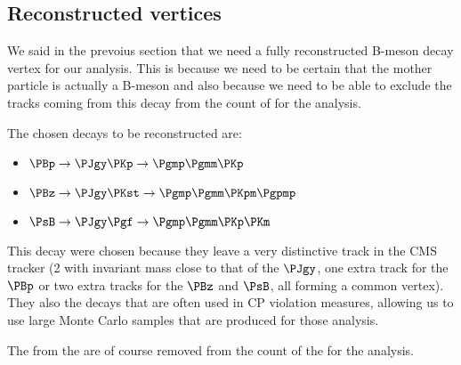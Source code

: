 \subsection{Reconstructed vertices}
\label{subsec:reco_ver}

We said in the prevoius section that we need a fully reconstructed B-meson decay vertex for our analysis.
This is because we need to be certain that the mother particle is actually a B-meson and also because we need to be able to exclude the tracks coming from this decay from the count of \Pgm for the analysis.

The chosen decays to be reconstructed are:
\begin{itemize}
	\item $\PBp\to\PJgy\PKp\to\Pgmp\Pgmm\PKp$
	\item $\PBz\to\PJgy\PKst\to\Pgmp\Pgmm\PKpm\Pgpmp$
	\item $\PsB\to\PJgy\Pgf\to\Pgmp\Pgmm\PKp\PKm$
\end{itemize}

This decay were chosen because they leave a very distinctive track in the CMS tracker (2 \Pgm with invariant mass close to that of the $\PJgy$, one extra track for the $\PBp$ or two extra tracks for the $\PBz$ and $\PsB$, all forming a common vertex).
They also the decays that are often used in CP violation measures, allowing us to use large Monte Carlo samples that are produced for those analysis.

The \Pgm from the \PJgy are of course removed from the count of the \Pgm for the analysis.
